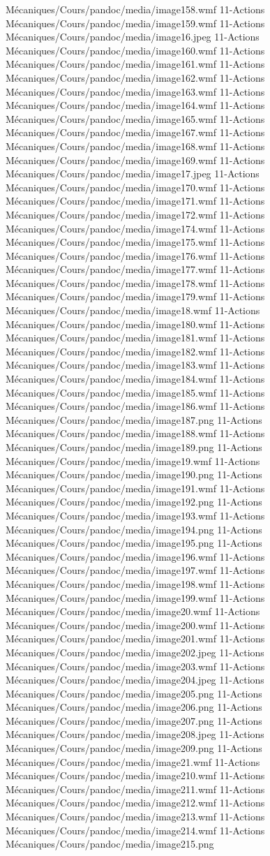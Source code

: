 Mécaniques/Cours/pandoc/media/image158.wmf 11-Actions Mécaniques/Cours/pandoc/media/image159.wmf 11-Actions Mécaniques/Cours/pandoc/media/image16.jpeg 11-Actions Mécaniques/Cours/pandoc/media/image160.wmf 11-Actions Mécaniques/Cours/pandoc/media/image161.wmf 11-Actions Mécaniques/Cours/pandoc/media/image162.wmf 11-Actions Mécaniques/Cours/pandoc/media/image163.wmf 11-Actions Mécaniques/Cours/pandoc/media/image164.wmf 11-Actions Mécaniques/Cours/pandoc/media/image165.wmf 11-Actions Mécaniques/Cours/pandoc/media/image167.wmf 11-Actions Mécaniques/Cours/pandoc/media/image168.wmf 11-Actions Mécaniques/Cours/pandoc/media/image169.wmf 11-Actions Mécaniques/Cours/pandoc/media/image17.jpeg 11-Actions Mécaniques/Cours/pandoc/media/image170.wmf 11-Actions Mécaniques/Cours/pandoc/media/image171.wmf 11-Actions Mécaniques/Cours/pandoc/media/image172.wmf 11-Actions Mécaniques/Cours/pandoc/media/image174.wmf 11-Actions Mécaniques/Cours/pandoc/media/image175.wmf 11-Actions Mécaniques/Cours/pandoc/media/image176.wmf 11-Actions Mécaniques/Cours/pandoc/media/image177.wmf 11-Actions Mécaniques/Cours/pandoc/media/image178.wmf 11-Actions Mécaniques/Cours/pandoc/media/image179.wmf 11-Actions Mécaniques/Cours/pandoc/media/image18.wmf 11-Actions Mécaniques/Cours/pandoc/media/image180.wmf 11-Actions Mécaniques/Cours/pandoc/media/image181.wmf 11-Actions Mécaniques/Cours/pandoc/media/image182.wmf 11-Actions Mécaniques/Cours/pandoc/media/image183.wmf 11-Actions Mécaniques/Cours/pandoc/media/image184.wmf 11-Actions Mécaniques/Cours/pandoc/media/image185.wmf 11-Actions Mécaniques/Cours/pandoc/media/image186.wmf 11-Actions Mécaniques/Cours/pandoc/media/image187.png 11-Actions Mécaniques/Cours/pandoc/media/image188.wmf 11-Actions Mécaniques/Cours/pandoc/media/image189.png 11-Actions Mécaniques/Cours/pandoc/media/image19.wmf 11-Actions Mécaniques/Cours/pandoc/media/image190.png 11-Actions Mécaniques/Cours/pandoc/media/image191.wmf 11-Actions Mécaniques/Cours/pandoc/media/image192.png 11-Actions Mécaniques/Cours/pandoc/media/image193.wmf 11-Actions Mécaniques/Cours/pandoc/media/image194.png 11-Actions Mécaniques/Cours/pandoc/media/image195.png 11-Actions Mécaniques/Cours/pandoc/media/image196.wmf 11-Actions Mécaniques/Cours/pandoc/media/image197.wmf 11-Actions Mécaniques/Cours/pandoc/media/image198.wmf 11-Actions Mécaniques/Cours/pandoc/media/image199.wmf 11-Actions Mécaniques/Cours/pandoc/media/image20.wmf 11-Actions Mécaniques/Cours/pandoc/media/image200.wmf 11-Actions Mécaniques/Cours/pandoc/media/image201.wmf 11-Actions Mécaniques/Cours/pandoc/media/image202.jpeg 11-Actions Mécaniques/Cours/pandoc/media/image203.wmf 11-Actions Mécaniques/Cours/pandoc/media/image204.jpeg 11-Actions Mécaniques/Cours/pandoc/media/image205.png 11-Actions Mécaniques/Cours/pandoc/media/image206.png 11-Actions Mécaniques/Cours/pandoc/media/image207.png 11-Actions Mécaniques/Cours/pandoc/media/image208.jpeg 11-Actions Mécaniques/Cours/pandoc/media/image209.png 11-Actions Mécaniques/Cours/pandoc/media/image21.wmf 11-Actions Mécaniques/Cours/pandoc/media/image210.wmf 11-Actions Mécaniques/Cours/pandoc/media/image211.wmf 11-Actions Mécaniques/Cours/pandoc/media/image212.wmf 11-Actions Mécaniques/Cours/pandoc/media/image213.wmf 11-Actions Mécaniques/Cours/pandoc/media/image214.wmf 11-Actions Mécaniques/Cours/pandoc/media/image215.png 